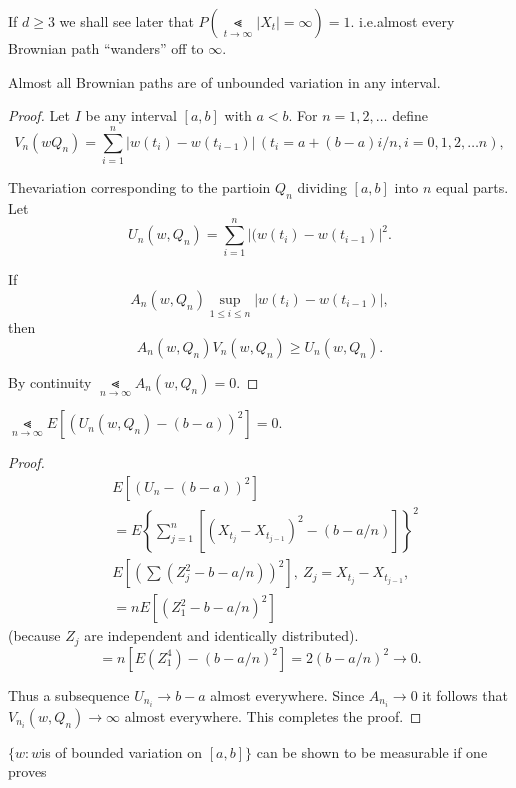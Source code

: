 \begin{remark*}
If $d\geq 3$ we shall see later that $P(\Lt\limits_{t\to
  \infty}|X_{t}|=\infty)=1$. i.e.\@ almost every Brownian path
``wanders'' off to $\infty$.
\end{remark*}

\begin{theorem*}
Almost all Brownian paths are of unbounded variation in any interval.
\end{theorem*}

\begin{proof}
Let $I$ be any interval $[a,b]$ with $a<b$. For $n=1,2,\ldots$ define
$$
V_{n}(wQ_{n})=\sum\limits^{n}_{i=1}|w(t_{i})-w(t_{i-1})|\,
(t_{i}=a+(b-a)i/n,i=0,1,2,\ldots n),
$$

The\pageoriginale variation corresponding to the partioin $Q_{n}$
dividing $[a,b]$ into $n$ equal parts. Let
$$
U_{n}(w,Q_{n})=\sum\limits^{n}_{i=1}|(w(t_{i})-w(t_{i-1})|^{2}.
$$

If 
$$
A_{n}(w,Q_{n})\sup\limits_{1\leq i\leq n}|w(t_{i})-w(t_{i-1})|,
$$
then
$$
A_{n}(w,Q_{n})V_{n}(w,Q_{n})\geq U_{n}(w,Q_{n}).
$$

By continuity $\Lt\limits_{n\to \infty}A_{n}(w,Q_{n})=0$.
\end{proof}

\begin{claim*}
$\Lt\limits_{n\to \infty}E[(U_{n}(w,Q_{n})-(b-a))^{2}]=0$.
\end{claim*}

\begin{proof}
\begin{align*}
& E[(U_{n}-(b-a))^{2}]\\
&=E\left\{\sum\limits^{n}_{j=1}[(X_{t_{j}}-X_{t_{j-1}})^{2}-(b-a/n)]\right\}^{2}\\
& E[(\sum (Z^{2}_{j}-b-a/n))^{2}],\ Z_{j}=X_{t_{j}}-X_{t_{j-1}},\\
&= nE[(Z^{2}_{1}-b-a/n)^{2}]
\end{align*}
(because $Z_{j}$ are independent and identically distributed).
$$
=n[E(Z^{4}_{1})-(b-a/n)^{2}]=2(b-a/n)^{2}\to 0.
$$

Thus a subsequence $U_{n_{i}}\to b-a$ almost everywhere. Since
$A_{n_{i}}\to 0$ it follows that $V_{n_{i}}(w,Q_{n})\to \infty$ almost
everywhere. This completes the proof.
\end{proof}

\begin{note*}
$\{w:w$\pageoriginale is of bounded variation on $[a,b]\}$ can be shown to be
  measurable if one proves
\end{note*}

